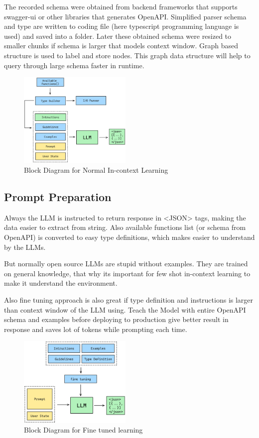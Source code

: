 \documentclass[conference]{IEEEtran}
\begin{document}
The recorded schema were obtained from backend frameworks that supports swagger-ui or other libraries that generates OpenAPI. Simplified parser schema and type are written to coding file (here typescript programming language is used) and saved into a folder. Later these obtained schema were resized to smaller chunks if schema is larger that models context window. Graph based structure is used to label and store nodes. This graph data structure will help to query through large schema faster in runtime. 

\begin{figure}[htbp]
    \centering
    \includegraphics[width=0.48\textwidth]{images/without-finetuning.png}  
    \caption{Block Diagram for Normal In-context Learning}
    \label{fig}
\end{figure}

\subsection{Prompt Preparation}
Always the LLM is instructed to return response in <JSON> tags, making the data easier to extract from string. Also available functions list (or schema from OpenAPI) is converted to easy type definitions, which makes easier to understand by the LLMs. 

But normally open source LLMs are stupid without examples. They are trained on general knowledge, that why its important for few shot in-context learning to make it understand the environment.

Also fine tuning approach is also great if type definition and instructions is larger than context window of the LLM using. Teach the Model with entire OpenAPI schema and examples before deploying to production give better result in response and saves lot of tokens while prompting each time. 

\begin{figure}[htbp]
\centering
\includegraphics[width=0.48\textwidth]{images/fine-tuned.png}  
\caption{Block Diagram for Fine tuned learning}
\label{fig}
\end{figure}
\end{document}
